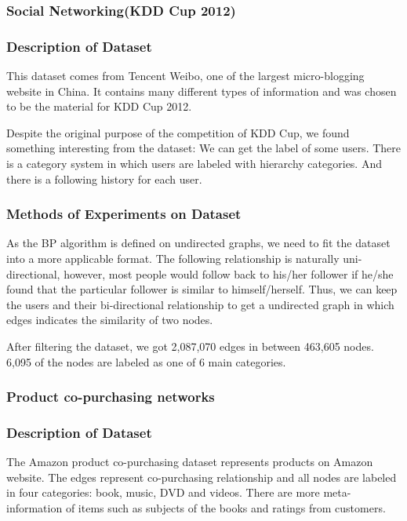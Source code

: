 \subsubsection{Social Networking(KDD Cup 2012)}

\subsubsection*{Description of Dataset}
This dataset comes from Tencent Weibo, one of the largest micro-blogging website in China.
It contains many different types of information and was chosen to be the material for KDD Cup 2012.

Despite the original purpose of the competition of KDD Cup, we found something interesting from the dataset:
We can get the label of some users. There is a category system in which users are labeled with hierarchy categories. And there is a following history for each user.

\subsubsection*{Methods of Experiments on Dataset}
As the BP algorithm is defined on undirected graphs, we need to fit the dataset into a more applicable format.
The following relationship is naturally uni-directional, however, most people would follow back to his/her follower if he/she found that the particular follower is similar to himself/herself.
Thus, we can keep the users and their bi-directional relationship to get a undirected graph in which edges indicates the similarity of two nodes.

After filtering the dataset, we got 2,087,070 edges in between 463,605 nodes. 6,095 of the nodes are labeled as one of 6 main categories.



\subsubsection{Product co-purchasing networks}

\subsubsection*{Description of Dataset}
The Amazon product co-purchasing dataset represents products on Amazon website. The edges represent co-purchasing relationship and all nodes are labeled in four categories: book, music, DVD and videos. There are more meta-information of items such as subjects of the books and ratings from customers.

